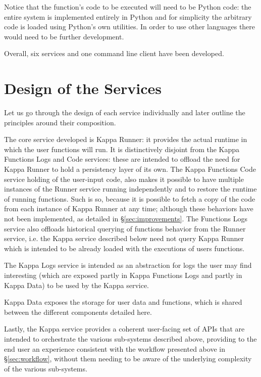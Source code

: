 \documentclass[a4paper]{ifacconf}
\begin{document}
    Notice that the function's code to be executed will need to be Python code: the entire system is implemented entirely in Python and for simplicity the arbitrary code is loaded using Python's own utilities.
    In order to use other languages there would need to be further development.
    
    Overall, six services and one command line client have been developed.
    
    \section{Design of the Services}\label{sec:structure}
    
    Let us go through the design of each service individually and later outline the principles around their composition.
    
    The core service developed is Kappa Runner: it provides the actual runtime in which the user functions will run.
    It is distinctively disjoint from the Kappa Functions Logs and Code services: these are intended to offload the need for Kappa Runner to hold a persistency layer of its own.
    The Kappa Functions Code service holding of the user-input code, also makes it possible to have multiple instances of the Runner service running independently and to restore the runtime of running functions.
    Such is so, because it is possible to fetch a copy of the code from each instance of Kappa Runner at any time; although these behaviors have not been implemented, as detailed in \S\ref{sec:improvements}.
    The Functions Logs service also offloads historical querying of functions behavior from the Runner service, i.e. the Kappa service described below need not query Kappa Runner which is intended to be already loaded with the executions of users functions.
    
    The Kappa Logs service is intended as an abstraction for logs the user may find interesting (which are exposed partly in Kappa Functions Logs and partly in Kappa Data) to be used by the Kappa service.
    
    Kappa Data exposes the storage for user data and functions, which is shared between the different components detailed here.
    
    Lastly, the Kappa service provides a coherent user-facing set of APIs that are intended to orchestrate the various sub-systems described above, providing to the end user an experience consistent with the workflow presented above in \S\ref{sec:workflow}, without them needing to be aware of the underlying complexity of the various sub-systems.
    
\end{document}
